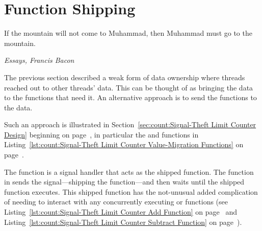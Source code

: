 \iffalse

Partial data ownership is also common within the Linux kernel.
For example, a given CPU might be permitted to read a given set of its
own per-CPU variables only with interrupts disabled, another CPU might
be permitted to read that same set of the first CPU's per-CPU variables
only when holding the corresponding per-CPU lock.
Then that given CPU would be permitted to update this set of its own
per-CPU variables if it both has interrupts disabled and holds its
per-CPU lock.
This arrangement can be thought of as a reader-writer lock that allows
each CPU very low-overhead access to its own set of per-CPU variables.
There are a great many variations on this theme.

For its own part, pure data ownership is also both common and useful,
for example, the per-thread memory-allocator caches discussed in
Section~\ref{sec:SMPdesign:Resource Allocator Caches}
starting on
page~\pageref{sec:SMPdesign:Resource Allocator Caches}.
In this algorithm, each thread's cache is completely private to that
thread.

\fi

\section{Function Shipping}
\label{sec:owned:Function Shipping}
%
\epigraph{If the mountain will not come to Muhammad, then Muhammad must
	  go to the mountain.}
	 {\emph{Essays, Francis Bacon}}

The previous section described a weak form of data ownership where
threads reached out to other threads' data.
This can be thought of as bringing the data to the functions that
need it.
An alternative approach is to send the functions to the data.

Such an approach is illustrated in
Section~\ref{sec:count:Signal-Theft Limit Counter Design}
beginning on
page~\pageref{sec:count:Signal-Theft Limit Counter Design},
in particular the  and
 functions in
Listing~\ref{lst:count:Signal-Theft Limit Counter Value-Migration Functions}
on
page~\pageref{lst:count:Signal-Theft Limit Counter Value-Migration Functions}.

The  function is a signal handler that
acts as the shipped function.
The  function in 
sends the signal---shipping the function---and then waits until
the shipped function executes.
This shipped function has the not-unusual added complication of
needing to interact with any concurrently executing 
or  functions (see
Listing~\ref{lst:count:Signal-Theft Limit Counter Add Function}
on
page~\pageref{lst:count:Signal-Theft Limit Counter Add Function} and
Listing~\ref{lst:count:Signal-Theft Limit Counter Subtract Function}
on
page~\pageref{lst:count:Signal-Theft Limit Counter Subtract Function}).

